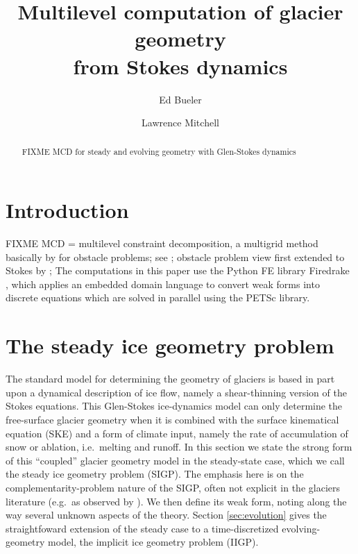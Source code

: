 \documentclass[letterpaper,final,12pt,reqno]{amsart}
\theoremstyle{claim}
\numberwithin{equation}{section}
\numberwithin{figure}{section}
\numberwithin{table}{section}
\numberwithin{theorem}{section}
\begin{document}
\title[Multilevel computation of glacier geometry from Stokes dynamics]{Multilevel computation of glacier geometry \\ from Stokes dynamics}

\author{Ed Bueler}

\author{Lawrence Mitchell}

\begin{abstract} FIXME MCD for steady and evolving geometry with Glen-Stokes dynamics
\end{abstract}

\maketitle


\thispagestyle{empty}

\section{Introduction} \label{sec:intro}

FIXME MCD = multilevel constraint decomposition, a multigrid \cite{Trottenbergetal2001} method basically by \cite{Tai2003} for obstacle problems; see \cite{Bueler2022};  obstacle problem view first extended to Stokes by \cite{WirbelJarosch2020};  The computations in this paper use the Python FE library Firedrake \cite{Rathgeberetal2016}, which applies an embedded domain language \cite{Alnaesetal2014} to convert weak forms into discrete equations which are solved in parallel using the PETSc \cite{Balayetal2020} library.


\section{The steady ice geometry problem} \label{sec:stokesgeometry}

The standard model for determining the geometry of glaciers is based in part upon a dynamical description of ice flow, namely a shear-thinning version of the Stokes equations.  This Glen-Stokes ice-dynamics model can only determine the free-surface glacier geometry when it is combined with the surface kinematical equation (SKE) and a form of climate input, namely the rate of accumulation of snow or ablation, i.e.~melting and runoff.  In this section we state the strong form of this ``coupled'' glacier geometry model in the steady-state case, which we call the steady ice geometry problem (SIGP).  The emphasis here is on the complementarity-problem nature of the SIGP, often not explicit in the glaciers literature (e.g.~as observed by \cite{SchoofHewitt2013}).  We then define its weak form, noting along the way several unknown aspects of the theory.  Section \ref{sec:evolution} gives the straightfoward extension of the steady case to a time-discretized evolving-geometry model, the implicit ice geometry problem (IIGP).
\end{document}
